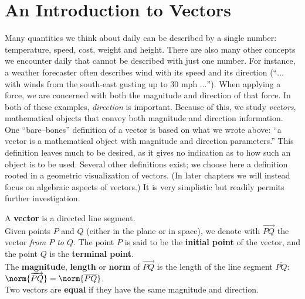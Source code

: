 \section{An Introduction to Vectors}\label{sec:vector_intro}

Many quantities we think about daily can be described by a single number: temperature, speed, cost, weight and height. There are also many other concepts we encounter daily that cannot be described with just one number. For instance, a weather forecaster often describes wind with its speed and its direction (``$\ldots$ with winds from the south-east gusting up to 30 mph $\ldots$''). When applying a force, we are concerned with both the magnitude and direction of that force. In both of these examples, \textit{direction} is important. Because of this, we study \textit{vectors}, mathematical objects that convey both magnitude and direction information.\\

One ``bare--bones'' definition of a vector is based on what we wrote above: ``a vector is a mathematical object with magnitude and direction parameters.'' This definition leaves much to be desired, as it gives no indication as to how such an object is to be used. Several other definitions exist; we choose here a definition rooted in a geometric visualization of vectors. (In later chapters we will instead focus on algebraic aspects of vectors.) It is very simplistic but readily permits further investigation.

{A \textbf{vector} is a directed line segment.\\

Given points $P$ and $Q$ (either in the plane or in space), we denote with $\overrightarrow{PQ}$ the vector \textit{from $P$ to $Q$}. The point $P$ is said to be the \textbf{initial point} of the vector, and the point $Q$ is the \textbf{terminal point}. \\

The \textbf{magnitude}, \textbf{length} or \textbf{norm} of $\overrightarrow{PQ}$ is the length of the line segment $\overline{PQ}$: $\norm{\overrightarrow{PQ}} = \norm{\overline{PQ}}$.\\

Two vectors are \textbf{equal} if they have the same magnitude and direction.
}

